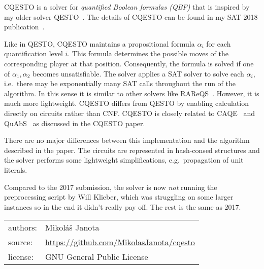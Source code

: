 \documentclass[a4paper,12pt]{article}
\title{\theTitle}
\author{{\miko}\\
IST/INESC-ID,\\
University of Lisbon, Portugal\\
\href{mailto:mikolas.janota@gmail.com}{mikolas.janota@gmail.com}
}
\def\miko{Mikol\'a\v{s} Janota}
\begin{document}
\maketitle

CQESTO is a solver for \emph{quantified Boolean formulas (QBF)} that 
is inspired by my older solver QESTO~\cite{janota-ijcai15}.
The details of CQESTO can be found in my SAT 2018 publication~\cite{janota-sat18}.

Like in QESTO, CQESTO maintains a propositional formula $\alpha_i$
for each quantification level $i$.
This formula determines the possible moves of the corresponding player at that position.
Consequently, the formula is solved if one of $\alpha_1,\alpha_2$ becomes unsatisfiable.
The solver applies a SAT solver to solve each $\alpha_i$,
i.e.\ there may be exponentially many SAT calls throughout the run of the algorithm.
In this sense it is similar to other solvers like RAReQS~\cite{janota-sat11,janota-sat12,janota-ai16}. However, it is much more lightweight. CQESTO differs from QESTO 
by enabling calculation directly on circuits rather than CNF.
%
CQESTO is closely related to CAQE~\cite{RabeFMCAD15} and QuAbS~\cite{TentrupSAT16} as discussed in the CQESTO paper.

There are no major differences between this implementation and the algorithm described in the paper.
The circuits are represented in hash-consed structures and  the solver
performs some lightweight simplifications, e.g.\ propagation of unit literals.

Compared to the 2017 submission, the solver is now  \emph{not} running the preprocessing script by Will Klieber,
which was struggling on some larger instances so in the end it didn't really pay off.
The rest is the same as 2017.


\noindent\begin{tabular}{ll}
     authors:& \miko\\
     source:& \url{https://github.com/MikolasJanota/cqesto}\\
     license:& GNU General Public License
\end{tabular}



\end{document}
